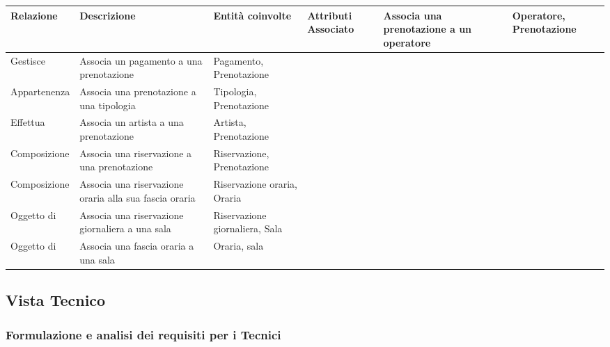 \documentclass{article}
\begin{document}
\renewcommand*{\arraystretch}{1.4}
\begin{longtable}{|p{.15\linewidth}|p{.25\linewidth}|p{.2\linewidth}|p{.2\linewidth}|}
    \hline
    \textbf{Relazione} & \textbf{Descrizione} & \textbf{Entità coinvolte} & \textbf{Attributi} 
    \endhead 
    \hline
     Associato & Associa una prenotazione a un operatore & Operatore, Prenotazione &  \\ \hline
     Gestisce & Associa un pagamento a una prenotazione & Pagamento, Prenotazione &  \\ \hline
     Appartenenza & Associa una prenotazione a una tipologia & Tipologia, Prenotazione &  \\ \hline
     Effettua & Associa un artista a una prenotazione & Artista, Prenotazione &  \\ \hline
     Composizione & Associa una riservazione a una prenotazione & Riservazione, Prenotazione &  \\ \hline
     Composizione & Associa una riservazione oraria alla sua fascia oraria & Riservazione oraria, Oraria &  \\ \hline
     Oggetto di & Associa una riservazione giornaliera a una sala & Riservazione giornaliera, Sala &  \\ \hline
     Oggetto di & Associa una fascia oraria a una sala & Oraria, sala &  \\ \hline
\end{longtable}

\newpage
\subsection{Vista Tecnico}
\subsubsection{Formulazione e analisi dei requisiti per i Tecnici}
\end{document}
